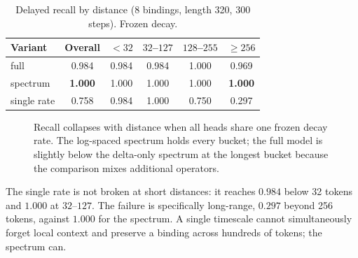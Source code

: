 \begin{table}[t]
\centering
\caption{Delayed recall by distance (8 bindings, length 320, 300 steps). Frozen decay.}
\label{tab:gap-a}
\small
\begin{tabular}{@{}l c c c c c@{}}
\toprule
Variant & Overall & $<32$ & $32$--$127$ & $128$--$255$ & $\geq256$ \\
\midrule
full & 0.984 & 0.984 & 0.984 & 1.000 & 0.969 \\
spectrum & \textbf{1.000} & 1.000 & 1.000 & 1.000 & \textbf{1.000} \\
single rate & 0.758 & 0.984 & 1.000 & 0.750 & 0.297 \\
\bottomrule
\end{tabular}
\end{table}

\begin{figure}[t]
\centering
{}
\caption{Recall collapses with distance when all heads share one frozen decay rate. The
log-spaced spectrum holds every bucket; the full model is slightly below the delta-only
spectrum at the longest bucket because the comparison mixes additional operators.}
\label{fig:gap-a}
\end{figure}

The single rate is not broken at short distances: it reaches $0.984$ below 32 tokens and
$1.000$ at $32$--$127$. The failure is specifically long-range, $0.297$ beyond 256 tokens,
against $1.000$ for the spectrum. A single timescale cannot simultaneously forget local
context and preserve a binding across hundreds of tokens; the spectrum can.

